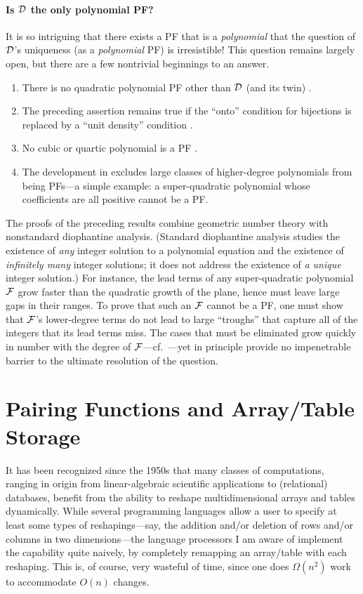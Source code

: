 \paragraph{Is $\mbox{$\cal D$}$ the only polynomial PF?}
It is so intriguing that there exists a PF that is a {\em polynomial}
that the question of $\mbox{$\cal D$}$'s uniqueness (as a {\em polynomial} PF) is
irresistible!  This question remains largely open, but there are a few
nontrivial beginnings to an answer.
\begin{enumerate}
\item
There is no quadratic polynomial PF other than $\mbox{$\cal D$}$ (and its twin)
\cite{FueterP23}.
\item
The preceding assertion remains true if the ``onto'' condition for
bijections is replaced by a ``unit density'' condition
\cite{LewR78a}.
\item
No cubic or quartic polynomial is a PF \cite{LewR78b}.
\item
The development in \cite{LewR78b} excludes large classes of
higher-degree polynomials from being PFs---a simple example: a
super-quadratic polynomial whose coefficients are all positive cannot
be a PF.
\end{enumerate}

The proofs of the preceding results combine geometric number theory
with nonstandard diophantine analysis.  (Standard diophantine analysis
studies the existence of {\em any} integer solution to a polynomial
equation and the existence of {\em infinitely many} integer solutions;
it does not address the existence of {\em a unique} integer solution.)
For instance, the lead terms of any super-quadratic polynomial $\mbox{$\cal F$}$
grow faster than the quadratic growth of the plane, hence must leave
large gaps in their ranges.  To prove that such an $\mbox{$\cal F$}$ cannot be a
PF, one must show that $\mbox{$\cal F$}$'s lower-degree terms do not lead to large
``troughs'' that capture all of the integers that its lead terms miss.
The cases that must be eliminated grow quickly in number with the
degree of $\mbox{$\cal F$}$---cf.~\cite{LewR78b}---yet in principle provide no
impenetrable barrier to the ultimate resolution of the question.

\section{Pairing Functions and Array/Table Storage}
\label{s.arrays}

\setcounter{equation}{0}

It has been recognized since the 1950s that many classes of
computations, ranging in origin from linear-algebraic scientific
applications to (relational) databases, benefit from the ability to
reshape multidimensional arrays and tables dynamically.  While several
programming languages allow a user to specify at least some types of
reshapings---say, the addition and/or deletion of rows and/or columns
in two dimensions---the language processors I am aware of implement
the capability quite naively, by completely remapping an array/table
with each reshaping.  This is, of course, very wasteful of time, since
one does $\Omega(n^2)$ work to accommodate $O(n)$ changes.

